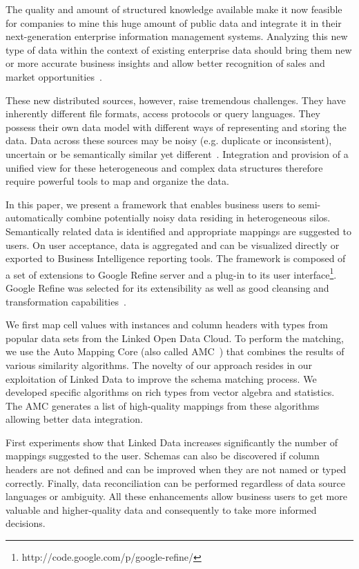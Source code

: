 \documentclass{../../Util/LaTEX/sig-alternate}
\begin{document}
The quality and amount of structured knowledge available make it now feasible for companies to mine this huge amount of public data and integrate it in their next-generation enterprise information management systems. Analyzing this new type of data within the context of existing enterprise data should bring them new or more accurate business insights and allow better recognition of sales and market opportunities~\cite{bigData}.

These new distributed sources, however, raise tremendous challenges. They have inherently different file formats, access protocols or query languages. They possess their own data model with different ways of representing and storing the data. Data across these sources may be noisy (e.g. duplicate or inconsistent), uncertain or be semantically similar yet different~\cite{kavitha}. Integration and provision of a unified view for these heterogeneous and complex data structures therefore require powerful tools to map and organize the data.

In this paper, we present a framework that enables business users to semi-automatically combine potentially noisy data residing in heterogeneous silos. Semantically related data is identified and appropriate mappings are suggested to users. On user acceptance, data is aggregated and can be visualized directly or exported to Business Intelligence reporting tools. The framework is composed of a set of extensions to Google Refine server and a plug-in to its user interface\footnote{http://code.google.com/p/google-refine/}. Google Refine was selected for its extensibility as well as good cleansing and transformation capabilities~\cite{bizer_linked_2009}.

We first map cell values with instances and column headers with types from popular data sets from the Linked Open Data Cloud. To perform the matching, we use the Auto Mapping Core (also called AMC~\cite{conf/icde/PeukertER12}) that combines the results of various similarity algorithms. The novelty of our approach resides in our exploitation of Linked Data to improve the schema matching process. We developed specific algorithms on rich types from vector algebra and statistics. The AMC generates a list of high-quality mappings from these algorithms allowing better data integration.

First experiments show that Linked Data increases significantly the number of mappings suggested to the user. Schemas can also be discovered if column headers are not defined and can be improved when they are not named or typed correctly. Finally, data reconciliation can be performed regardless of data source languages or ambiguity. All these enhancements allow business users to get more valuable and higher-quality data and consequently to take more informed decisions.
\end{document}
